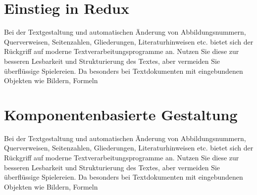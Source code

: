 \section{Einstieg in Redux}
Bei der Textgestaltung und automatischen Änderung von Abbildungsnummern, Querverweisen,
Seitenzahlen, Gliederungen, Literaturhinweisen etc. bietet sich der Rückgriff
auf moderne Textverarbeitungsprogramme an. Nutzen Sie diese zur besseren Lesbarkeit
und Strukturierung des Textes, aber vermeiden Sie überflüssige Spielereien. Da
besonders bei Textdokumenten mit eingebundenen Objekten wie Bildern, Formeln

\section{Komponentenbasierte Gestaltung}
Bei der Textgestaltung und automatischen Änderung von Abbildungsnummern, Querverweisen,
Seitenzahlen, Gliederungen, Literaturhinweisen etc. bietet sich der Rückgriff
auf moderne Textverarbeitungsprogramme an. Nutzen Sie diese zur besseren Lesbarkeit
und Strukturierung des Textes, aber vermeiden Sie überflüssige Spielereien. Da
besonders bei Textdokumenten mit eingebundenen Objekten wie Bildern, Formeln
